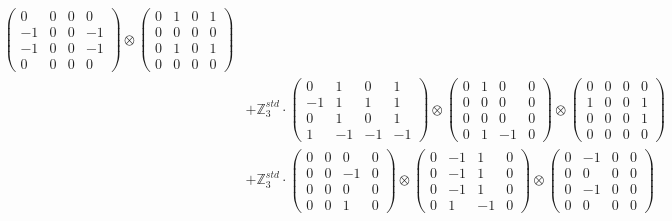 \documentclass{article}
\begin{document}
{\begin{align}
            \begin{pmatrix} 0 & 0 & 0 & 0 \\ -1 & 0 & 0 & -1 \\ -1 & 0 & 0 & -1 \\ 0 & 0 & 0 & 0 \end{pmatrix} \otimes 
            \begin{pmatrix} 0 & 1 & 0 & 1 \\ 0 & 0 & 0 & 0 \\ 0 & 1 & 0 & 1 \\ 0 & 0 & 0 & 0 \end{pmatrix} \\ 
        &+ \label{Rs16-Rc11-Solution-9-c20} \mathbb{Z}_3^{std} \cdot 
            \begin{pmatrix} 0 & 1 & 0 & 1 \\ -1 & 1 & 1 & 1 \\ 0 & 1 & 0 & 1 \\ 1 & -1 & -1 & -1 \end{pmatrix} \otimes 
            \begin{pmatrix} 0 & 1 & 0 & 0 \\ 0 & 0 & 0 & 0 \\ 0 & 0 & 0 & 0 \\ 0 & 1 & -1 & 0 \end{pmatrix} \otimes 
            \begin{pmatrix} 0 & 0 & 0 & 0 \\ 1 & 0 & 0 & 1 \\ 0 & 0 & 0 & 1 \\ 0 & 0 & 0 & 0 \end{pmatrix} \\ 
        &+ \label{Rs16-Rc11-Solution-9-c21} \mathbb{Z}_3^{std} \cdot 
            \begin{pmatrix} 0 & 0 & 0 & 0 \\ 0 & 0 & -1 & 0 \\ 0 & 0 & 0 & 0 \\ 0 & 0 & 1 & 0 \end{pmatrix} \otimes 
            \begin{pmatrix} 0 & -1 & 1 & 0 \\ 0 & -1 & 1 & 0 \\ 0 & -1 & 1 & 0 \\ 0 & 1 & -1 & 0 \end{pmatrix} \otimes 
            \begin{pmatrix} 0 & -1 & 0 & 0 \\ 0 & 0 & 0 & 0 \\ 0 & -1 & 0 & 0 \\ 0 & 0 & 0 & 0 \end{pmatrix} \\ 

\end{align}}
\end{document}
